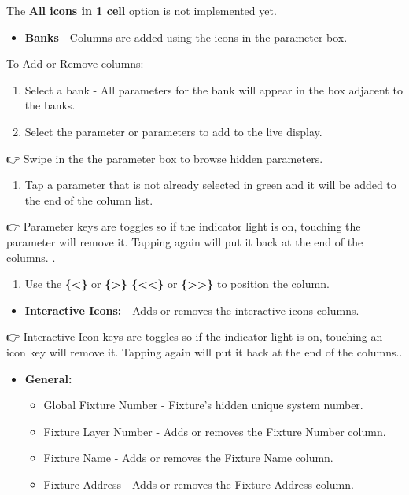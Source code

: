 \documentclass[
]{article}
\providecommand{\tightlist}{%
  \setlength{\itemsep}{0pt}\setlength{\parskip}{0pt}}
\begin{document}
The \textbf{All icons in 1 cell} option is not implemented yet.

\begin{itemize}
\tightlist
\item
  \textbf{Banks} - Columns are added using the icons in the parameter box.
\end{itemize}

To Add or Remove columns:

\begin{enumerate}
\def\labelenumi{\arabic{enumi}.}
\item
  Select a bank - All parameters for the bank will appear in the box adjacent to the banks.
\item
  Select the parameter or parameters to add to the live display.
\end{enumerate}

👉 Swipe in the the parameter box to browse hidden parameters.

\begin{enumerate}
\def\labelenumi{\arabic{enumi}.}
\setcounter{enumi}{2}
\tightlist
\item
  Tap a parameter that is not already selected in green and it will be added to the end of the column list.
\end{enumerate}

👉 {Parameter keys are toggles so if the indicator light is on, touching the parameter will remove it. Tapping again will put it back at the end of the columns. }.

\begin{enumerate}
\def\labelenumi{\arabic{enumi}.}
\setcounter{enumi}{3}
\tightlist
\item
  Use the \textbf{\{\textbar\textless\}} or \textbf{\{\textgreater\textbar\} \{\textbar\textless\textless\}} or \textbf{\{\textgreater\textgreater\textbar\}} to position the column.
\end{enumerate}

\begin{itemize}
\tightlist
\item
  \textbf{Interactive Icons:} - Adds or removes the interactive icons columns.
\end{itemize}

👉 {Interactive Icon keys are toggles so if the indicator light is on, touching an icon key will remove it. Tapping again will put it back at the end of the columns.}.

\begin{itemize}
\item
  \textbf{General:}

  \begin{itemize}
  \item
    Global Fixture Number - Fixture's hidden unique system number.
  \item
    Fixture Layer Number - Adds or removes the Fixture Number column.
  \item
    Fixture Name - Adds or removes the Fixture Name column.
  \item
    Fixture Address - Adds or removes the Fixture Address column.
  \end{itemize}
\end{itemize}
\end{document}
